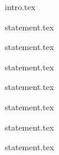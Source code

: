{intro.tex}

{statement.tex}

{statement.tex}

{statement.tex}

{statement.tex}

{statement.tex}

{statement.tex}

{statement.tex}